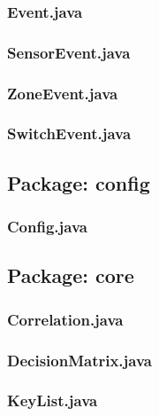\subsubsection{Event.java}

\subsubsection{SensorEvent.java}

\subsubsection{ZoneEvent.java}

\subsubsection{SwitchEvent.java}



\subsection{Package: config}
\subsubsection{Config.java}


\subsection{Package: core}
\subsubsection{Correlation.java}

\subsubsection{DecisionMatrix.java}

\subsubsection{KeyList.java}


